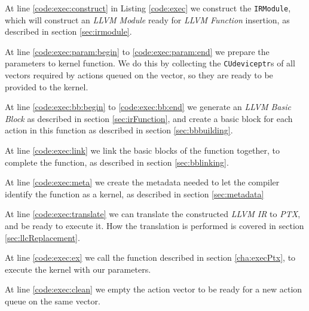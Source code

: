 At line \ref{code:exec:construct} in Listing \ref{code:exec} we construct the \texttt{IRModule}, which will construct an \textit{LLVM Module} ready for \textit{LLVM Function} insertion, as described in section \ref{sec:irmodule}.

At line \ref{code:exec:param:begin} to \ref{code:exec:param:end} we prepare the parameters to kernel function. We do this by collecting the \texttt{CUdeviceptr}s of all vectors required by actions queued on the vector, so they are ready to be provided to the kernel.

At line \ref{code:exec:bb:begin} to \ref{code:exec:bb:end} we generate an \textit{LLVM Basic Block} as described in section \ref{sec:irFunction}, and create a basic block for each action in this function as described in section \ref{sec:bbbuilding}.

At line \ref{code:exec:link} we link the basic blocks of the function together, to complete the function, as described in section \ref{sec:bblinking}.

At line \ref{code:exec:meta} we create the metadata needed to let the compiler identify the function as a kernel, as described in section \ref{sec:metadata}

At line \ref{code:exec:translate} we can translate the constructed \textit{LLVM IR} to \textit{PTX}, and be ready to execute it. How the translation is performed is covered in section \ref{sec:llcReplacement}.

At line \ref{code:exec:ex} we call the function described in section \ref{cha:execPtx}, to execute the kernel with our parameters.

At line \ref{code:exec:clean} we empty the action vector to be ready for a new action queue on the same vector.


